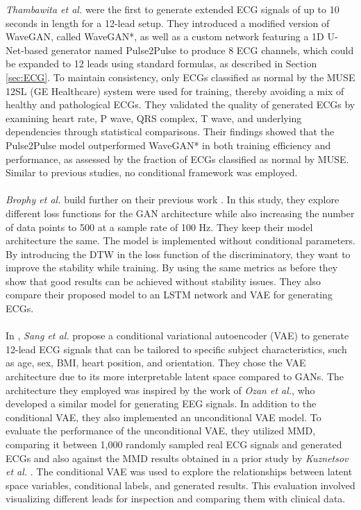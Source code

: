 \textit{Thambawita et al.} \cite{thambawitaDeepFakeElectrocardiogramsUsing2021} were the first to generate extended ECG signals of up to 10 seconds in length for a 12-lead setup. They introduced a modified version of WaveGAN, called WaveGAN*, as well as a custom network featuring a 1D U-Net-based generator named Pulse2Pulse to produce 8 ECG channels, which could be expanded to 12 leads using standard formulas, as described in Section \ref{sec:ECG}. To maintain consistency, only ECGs classified as normal by the MUSE 12SL (GE Healthcare) system were used for training, thereby avoiding a mix of healthy and pathological ECGs. They validated the quality of generated ECGs by examining heart rate, P wave, QRS complex, T wave, and underlying dependencies through statistical comparisons. Their findings showed that the Pulse2Pulse model outperformed WaveGAN* in both training efficiency and performance, as assessed by the fraction of ECGs classified as normal by MUSE. Similar to previous studies, no conditional framework was employed.
\\ \\
\textit{Brophy et al.} \cite{brophyMultivariateGenerativeAdversarial2021} build further on their previous work \cite{brophySynthesisDependentMultichannel2020}. In this study, they explore different loss functions for the GAN architecture while also increasing the number of data points to 500 at a sample rate of 100 Hz. They keep their model architecture the same. The model is implemented without conditional parameters. By introducing the DTW in the loss function of the discriminatory, they want to improve the stability while training. By using the same metrics as before they show that good results can be achieved without stability issues. They also compare their proposed model to an LSTM network and VAE for generating ECGs. 
\\ \\
In \cite{sangGeneration12LeadElectrocardiogram2022}, \textit{Sang et al.} propose a conditional variational autoencoder (VAE) to generate 12-lead ECG signals that can be tailored to specific subject characteristics, such as age, sex, BMI, heart position, and orientation. They chose the VAE architecture due to its more interpretable latent space compared to GANs. The architecture they employed was inspired by the work of \textit{Ozan et al.}, who developed a similar model for generating EEG signals. In addition to the conditional VAE, they also implemented an unconditional VAE model. To evaluate the performance of the unconditional VAE, they utilized MMD, comparing it between 1,000 randomly sampled real ECG signals and generated ECGs and also against the MMD results obtained in a prior study by \textit{Kuznetsov et al.} \cite{kuznetsovElectrocardiogramGenerationFeature2020}. The conditional VAE was used to explore the relationships between latent space variables, conditional labels, and generated results. This evaluation involved visualizing different leads for inspection and comparing them with clinical data.
